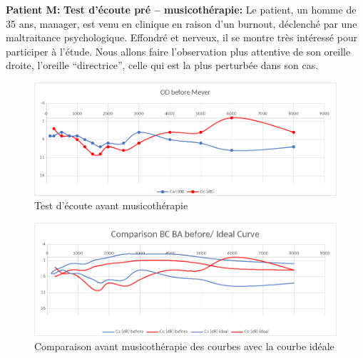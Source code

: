 \textbf{Patient M:}
\textbf{ Test d'écoute pré -- musicothérapie:}
Le patient, un homme de 35 ans, manager,  est venu en clinique en raison d'un burnout, déclenché par 
une maltraitance psychologique. Effondré et nerveux, il  se montre très
intéressé pour participer à l'étude. Nous allons faire
l'observation plus attentive de
son oreille droite, l'oreille ``directrice'',
celle qui est la plus perturbée dans son cas.


\begin{figure}[tbh]
	\centering
	\includegraphics[width=1\linewidth]{images/clinique/od_before_meyer.png}
	\caption{Test d'écoute avant musicothérapie}
	\label{fig:odbeforemeyer}
\end{figure}
	\begin{figure}
	\centering
	\includegraphics[width=1\linewidth]{images/clinique/comparison_bc_ba_before_vs_ideal_curve_meyer.png}
	\caption[Comparaison avec la courbe idéale]{Comparaison avant
		musicothérapie des
		courbes  avec la courbe idéale}
	\label{fig:comparisonbcbabeforevsidealcurvemeyer}
\end{figure}


